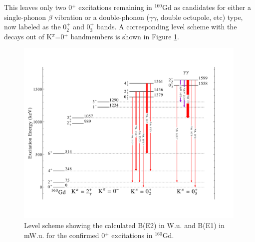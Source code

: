 This leaves only two 0$^+$ excitations remaining in $^{160}$Gd as candidates for either a single-phonon $\beta$ vibration or a double-phonon ($\gamma\gamma$, double octupole, etc) type, now labeled as the 0$^+_2$ and 0$^+_3$ bands.  A corresponding level scheme with the decays out of K$^\pi$=0$^+$ bandmembers is shown in Figure \ref{fig:160Gd_0s}. 

\begin{center}
\begin{figure}[h!]
\includegraphics[width=0.99\textwidth]{figures/160Gd_Partial0sRevised.pdf}
\caption{Level scheme showing the calculated B(E2) in W.u. and B(E1) in mW.u. for the confirmed 0$^+$ excitations in $^{160}$Gd.
\label{fig:160Gd_0s}}
\end{figure}
\end{center}

